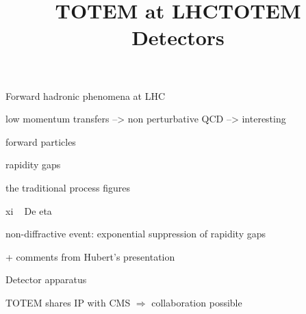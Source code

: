 \vfil


\newpage %
\title{}

Forward hadronic phenomena at LHC

\> low momentum transfers --> non perturbative QCD --> interesting

\> forward particles

\> rapidity gaps

\> the traditional process figures

\> xi ~ De eta

\> non-diffractive event: exponential suppression of rapidity gaps



\newpage %
\title{}


+ comments from Hubert's presentation

\newpage %
\hbox{}
\vfil

\vskip2mm
\centerline{\PartFont\cYe Detector apparatus\cFg}

\vfil


\newpage %
\title{TOTEM at LHC}


\vfil
\centerline{TOTEM shares IP with CMS $\Rightarrow$ collaboration possible}

\newpage %
\title{TOTEM Detectors}

\vfil


